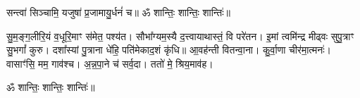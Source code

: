 
सन्त्वा॑ सिञ्चामि॒ यजुषा॑ प्र॒जामायु॒र्धनं॑ च॥ ॐ शान्तिः॒ शान्तिः॒ शान्तिः॑॥

सु॒म॒ङ्ग॒लीरि॒यं व॒धूरि॒माꣳ स॑मेत॒ पश्य॑त। 
सौभा᳚ग्यम॒स्यै द॒त्त्वायाथास्तं॒ वि परे॑तन। 
इ॒मां त्वमि॑न्द्र मीढ्वः सुपु॒त्राꣳ सु॒भगां᳚ कुरु। 
दशा᳚स्यां पु॒त्राना धे॑हि॒ पति॑मेकाद॒शं कृ॑धि॥ आ॒वह॑न्ती वितन्वा॒ना। 
कु॒र्वा॒णा चीर॑मा॒त्मनः॑। 
वासाꣳ॑सि॒ मम॒ गाव॑श्च। 
अ॒न्न॒पा॒ने च॑ सर्व॒दा। 
ततो॑ मे॒ श्रिय॒माव॑ह।

ॐ शान्तिः॒ शान्तिः॒ शान्तिः॑॥

\closesection